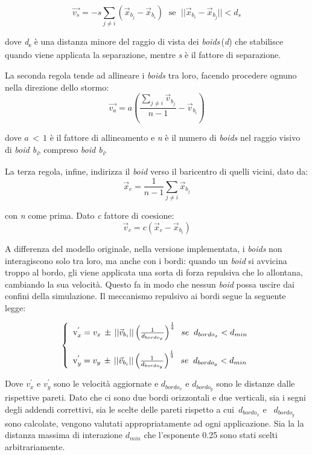 \documentclass{article}
\begin{document}
\smallskip
\[
\vec{v_s} = -s \sum_{j \neq i} (\vec{x}_{b_j} - \vec{x}_{b_i}) \; \text{ se } \; ||\vec{x}_{b_i} - \vec{x}_{b_j}|| < d_s 
\]

\smallskip

dove \textit{d}\textsubscript{s} è una distanza minore del raggio di vista dei \textit{boids}\,(\textit{d}) che stabilisce quando viene applicata la separazione, mentre \textit{s} è il fattore di separazione.

La seconda regola tende ad allineare i \textit{boids} tra loro, facendo procedere ognuno nella direzione dello stormo:\medskip
\[
\vec{v_a} = a\left(\frac{\sum_{j \neq i} \vec{v}_{b_j}}{n - 1}  - \vec{v}_{b_i}\right)
\]

\medskip

dove $\textit{a}\,<\,1$ è il fattore di allineamento e \textit{n} è il numero di \textit{boids} nel raggio visivo di \textit{boid b\textsubscript{i}}, compreso \textit{boid b\textsubscript{i}}. 

La terza regola, infine, indirizza il \textit{boid} verso il baricentro di quelli vicini, dato da:\smallskip
\[
{\vec{x}}_c = \frac{1}{n - 1} \sum_{j \neq i}  \vec{x}_{b_j}
\]

con \textit{n} come prima. Dato \textit{c} fattore di coesione:
\[
\vec{v}_c = c \left( \vec{x}_c - \vec{x}_{b_i} \right)
\]

\medskip
A differenza del modello originale, nella versione implementata, i \textit{boids} non interagiscono solo tra loro, ma anche con i bordi: quando un \textit{boid} si avvicina troppo al bordo, gli viene applicata una sorta di forza repulsiva che lo allontana, cambiando la sua velocità. Questo fa in modo che nessun \textit{boid} possa uscire dai confini della simulazione. Il meccanismo repulsivo ai bordi segue la seguente legge:

\label{repulsive}\[
 \left\{
 \begin{array}{l}
      \text v_x^{'}= v_x \,\pm \,|| \vec{v}_{b_i} || \left(\frac{1}{d_{bordo_{x}}}\right)^{\frac{1}{4}} \;\;se\;\; d_{bordo_{x}} < d_{min} \\ \\
      \text v_y^{'} = v_y\, \pm \, || \vec{v}_{b_i} || \left(\frac{1}{d_{bordo_{y}}}\right)^{\frac{1}{4}} \;\;se\;\; d_{bordo_{y}} < d_{min}
       
 \end{array} \right.
\]

\medskip
Dove $v_x^{'}$ e $v_y^{'}$ sono le velocità aggiornate e $d_{bordo_x}$ e $d_{bordo_y}$ sono le distanze dalle rispettive pareti. Dato che ci sono due bordi orizzontali e due verticali, sia i segni degli addendi correttivi, sia le scelte delle pareti rispetto a cui \,$d_{bordo_x}$ e \, $d_{bordo_y}$ sono calcolate, vengono valutati appropriatamente ad ogni applicazione. 
 Sia la la distanza massima di interazione $d_{min}$ che l'esponente 0.25 sono stati scelti arbitrariamente.
\end{document}
